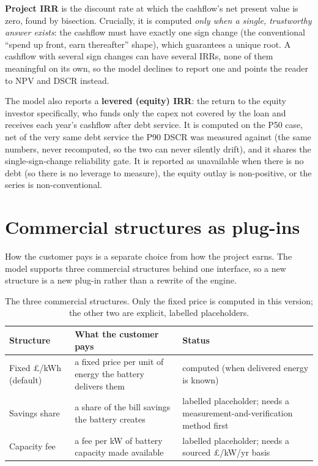 \textbf{Project IRR} is the discount rate at which the cashflow's net present value is zero, found by bisection. Crucially, it is computed \emph{only when a single, trustworthy answer exists}: the cashflow must have exactly one sign change (the conventional ``spend up front, earn thereafter'' shape), which guarantees a unique root. A cashflow with several sign changes can have several IRRs, none of them meaningful on its own, so the model declines to report one and points the reader to NPV and DSCR instead.

The model also reports a \textbf{levered (equity) IRR}: the return to the equity investor specifically, who funds only the capex not covered by the loan and receives each year's cashflow after debt service. It is computed on the P50 case, net of the very same debt service the P90 DSCR was measured against (the same numbers, never recomputed, so the two can never silently drift), and it shares the single-sign-change reliability gate. It is reported as unavailable when there is no debt (so there is no leverage to measure), the equity outlay is non-positive, or the series is non-conventional.

\section{Commercial structures as plug-ins}

How the customer pays is a separate choice from how the project earns. The model supports three commercial structures behind one interface, so a new structure is a new plug-in rather than a rewrite of the engine.

\begin{table}[H]
\centering
\caption{The three commercial structures. Only the fixed price is computed in this version; the other two are explicit, labelled placeholders.}
\label{tab:structures}
\small\sffamily
\begin{tabularx}{\textwidth}{@{}l L L@{}}
\toprule
\textbf{Structure} & \textbf{What the customer pays} & \textbf{Status} \\
\midrule
Fixed \pounds/kWh (default) & a fixed price per unit of energy the battery delivers them & computed (when delivered energy is known) \\
Savings share & a share of the bill savings the battery creates & labelled placeholder; needs a measurement-and-verification method first \\
Capacity fee & a fee per kW of battery capacity made available & labelled placeholder; needs a sourced \pounds/kW/yr basis \\
\bottomrule
\end{tabularx}
\end{table}

